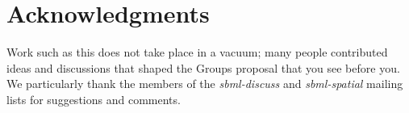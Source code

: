 
\section{Acknowledgments}

Work such as this does not take place in a vacuum; many people contributed ideas and discussions that shaped the Groups proposal that you see before you.  We particularly thank the members of the \emph{sbml-discuss} and \emph{sbml-spatial} mailing lists for suggestions and comments.


